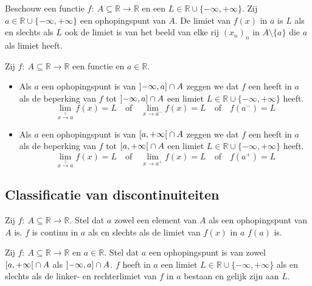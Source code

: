 \documentclass[main.tex]{subfiles}
\begin{document}
\begin{pr}
  Beschouw een functie $f:\ A \subseteq \mathbb{R} \rightarrow \mathbb{R}$ en een $L \in \mathbb{R} \cup \{-\infty,+\infty\}$.
  Zij $a \in \mathbb{R} \cup \{-\infty,+\infty\}$ een ophopingspunt van $A$.
  De limiet van $f(x)$ in $a$ is $L$ als en slechts als $L$ ook de limiet is van het beeld van elke rij $(x_{n})_{n}$ in $A\setminus\{a\}$ die $a$ als limiet heeft.
\end{pr}

\begin{de}
  Zij $f:\ A \subseteq \mathbb{R} \rightarrow \mathbb{R}$ een functie en $a\in \mathbb{R}$.
  \begin{itemize}
  \item Als $a$ een ophopingspunt is van $\interval[open left]{-\infty}{a} \cap A$ zeggen we dat $f$ een  heeft in $a$ als de beperking van $f$ tot $\interval[open left]{-\infty}{a} \cap A$ een limiet $L \in \mathbb{R} \cup \{ -\infty, +\infty \}$ heeft.
    \[ \lim_{x \overset{<}{\rightarrow} a}f(x) = L \quad\text{of}\quad \lim_{x \rightarrow a^{-}}f(x) = L \quad\text{of}\quad f(a^{-}) = L \]
  \item Als $a$ een ophopingspunt is van $\interval[open right]{a}{+\infty} \cap A$ zeggen we dat $f$ een  heeft in $a$ als de beperking van $f$ tot $\interval[open right]{a}{+\infty} \cap A$ een limiet $L \in \mathbb{R} \cup \{ -\infty, +\infty \}$ heeft.
    \[ \lim_{x \overset{>}{\rightarrow} a}f(x) = L \quad\text{of}\quad \lim_{x \rightarrow a^{+}}f(x) = L \quad\text{of}\quad f(a^{+}) = L \]
  \end{itemize}
\end{de}

\subsection{Classificatie van discontinuiteiten}

\begin{pr}
  Zij $f:\ A \subseteq \mathbb{R} \rightarrow \mathbb{R}$.
  Stel dat $a$ zowel een element van $A$ als een ophopingspunt van $A$ is.
  $f$ is continu in $a$ als en slechts als de limiet van $f(x)$ in $a$ $f(a)$ is.
\end{pr}

\begin{pr}
  Zij $f:\ A \subseteq \mathbb{R} \rightarrow \mathbb{R}$ en $a\in \mathbb{R}$.
  Stel dat $a$ een ophopingspunt is van zowel $\interval[open right]{a}{+\infty} \cap A$ als $\interval[open left]{-\infty}{a} \cap A$.
  $f$ heeft in $a$ een limiet $L\in \mathbb{R}\cup \{ -\infty,+\infty\}$ als en slechts als de linker- en rechterlimiet van $f$ in $a$ bestaan en gelijk zijn aan $L$.
\end{pr}
\end{document}
